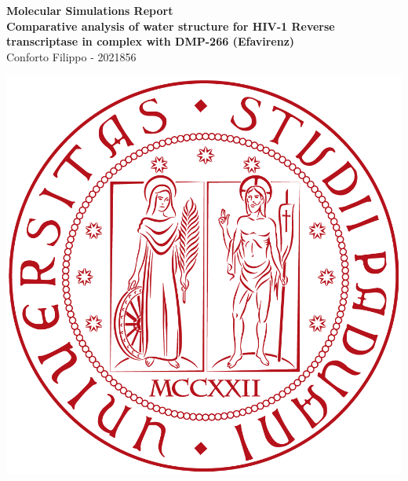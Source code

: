 \documentclass[12pt]{article}
\begin{document}

\begin{titlepage}
    \begin{flushright}
        \LARGE{\textbf{Molecular Simulations Report}}\\
        \vfill
        \Huge{\textbf{Comparative analysis of water structure for HIV-1 Reverse transcriptase in complex with DMP-266 (Efavirenz)}}\\
        \vfill
        \large Conforto Filippo - 2021856\\

        \vfill


        \includegraphics[width=0.3\linewidth]{logo.png}\\


    \end{flushright}
\end{titlepage}
\end{document}
